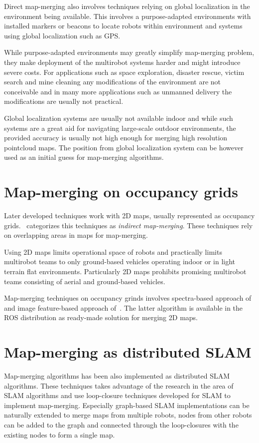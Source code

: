 Direct map-merging also involves techniques relying on global localization in the environment being available. This involves a purpose-adapted environments with installed markers or beacons to locate robots within environment and systems using global localization such as \gls{GPS}.

While purpose-adapted environments may greatly simplify map-merging problem, they make deployment of the multirobot systems harder and might introduce severe costs. For applications such as space exploration, disaster rescue, victim search and mine cleaning any modifications of the environment are not conceivable and in many more applications such as unmanned delivery the modifications are usually not practical.

Global localization systems are usually not available indoor and while such systems are a great aid for navigating large-scale outdoor environments, the provided accuracy is usually not high enough for merging high resolution pointcloud maps. The position from global localization system can be however used as an initial guess for map-merging algorithms.

\section{Map-merging on occupancy grids}

Later developed techniques work with \gls{2D} maps, usually represented as occupancy grids. \citet{lee2012survey}~categorizes this techniques as \textit{indirect map-merging}. These techniques rely on overlapping areas in maps for map-merging.

Using \gls{2D} maps limits operational space of robots and practically limits multirobot teams to only ground-based vehicles operating indoor or in light terrain flat environments. Particularly \gls{2D} maps prohibits promising multirobot teams consisting of aerial and ground-based vehicles.

Map-merging techniques on occupancy grinds involves spectra-based approach of~\citet{carpin2008spectra} and image feature-based approach of~\citet{Horner2016}. The latter algorithm is available in the \gls{ROS} distribution as ready-made solution for merging \gls{2D} maps.

\section{Map-merging as distributed SLAM}

Map-merging algorithms has been also implemented as distributed \gls{SLAM} algorithms. These techniques takes advantage of the research in the area of \gls{SLAM} algorithms and use loop-closure techniques developed for \gls{SLAM} to implement map-merging. Especially graph-based \gls{SLAM} implementations can be naturally extended to merge maps from multiple robots, nodes from other robots can be added to the graph and connected through the loop-closures with the existing nodes to form a single map.

